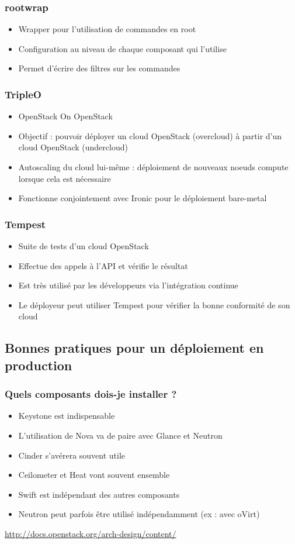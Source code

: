   \begin{frame}
    \frametitle{rootwrap}
    \begin{itemize}
      \item Wrapper pour l'utilisation de commandes en root
      \item Configuration au niveau de chaque composant qui l'utilise
      \item Permet d'écrire des filtres sur les commandes
    \end{itemize}
  \end{frame}

  \begin{frame}
    \frametitle{TripleO}
    \begin{itemize}
      \item OpenStack On OpenStack
      \item Objectif : pouvoir déployer un cloud OpenStack (overcloud) à partir d'un cloud OpenStack (undercloud)
      \item Autoscaling du cloud lui-même : déploiement de nouveaux noeuds compute lorsque cela est nécessaire
      \item Fonctionne conjointement avec Ironic pour le déploiement bare-metal
    \end{itemize}
  \end{frame}

  \begin{frame}
    \frametitle{Tempest}
    \begin{itemize}
      \item Suite de tests d'un cloud OpenStack
      \item Effectue des appels à l'API et vérifie le résultat
      \item Est très utilisé par les développeurs via l'intégration continue
      \item Le déployeur peut utiliser Tempest pour vérifier la bonne conformité de son cloud
    \end{itemize}
  \end{frame}

  \subsection[Déployer en production]{Bonnes pratiques pour un déploiement en production}

  \begin{frame}
    \frametitle{Quels composants dois-je installer ?}
    \begin{itemize}
      \item Keystone est indispensable
      \item L'utilisation de Nova va de paire avec Glance et Neutron
      \item Cinder s'avérera souvent utile
      \item Ceilometer et Heat vont souvent ensemble
      \item Swift est indépendant des autres composants
      \item Neutron peut parfois être utilisé indépendamment (ex : avec oVirt)
    \end{itemize}
    \url{http://docs.openstack.org/arch-design/content/}
  \end{frame}

